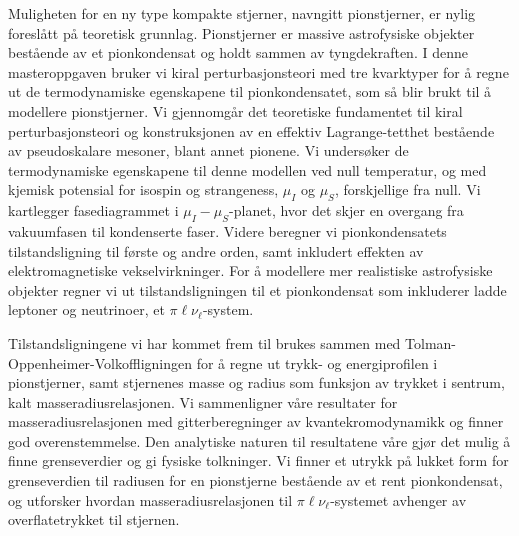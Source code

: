 \vspace*{1.5cm}
Muligheten for en ny type kompakte stjerner, navngitt pionstjerner, er nylig foreslått på teoretisk grunnlag.
Pionstjerner er massive astrofysiske objekter bestående av et pionkondensat og holdt sammen av tyngdekraften.
I denne masteroppgaven bruker vi kiral perturbasjonsteori med tre kvarktyper for å regne ut de termodynamiske egenskapene til pionkondensatet, som så blir brukt til å modellere pionstjerner.
Vi gjennomgår det teoretiske fundamentet til kiral perturbasjonsteori og konstruksjonen av en effektiv Lagrange-tetthet bestående av pseudoskalare mesoner, blant annet pionene.
Vi undersøker de termodynamiske egenskapene til denne modellen ved null temperatur, og med kjemisk potensial for isospin og strangeness, $\mu_I$ og $\mu_S$, forskjellige fra null.
Vi kartlegger fasediagrammet i $\mu_I-\mu_S$-planet, hvor det skjer en overgang fra vakuumfasen til kondenserte faser.
Videre beregner vi pionkondensatets tilstandsligning til første og andre orden, samt inkludert effekten av elektromagnetiske vekselvirkninger.
For å modellere mer realistiske astrofysiske objekter regner vi ut tilstandsligningen til et pionkondensat som inkluderer ladde leptoner og neutrinoer, et $\pi\ell\nu_\ell$-system.

Tilstandsligningene vi har kommet frem til brukes sammen med Tolman-Oppenheimer-Volkoffligningen for å regne ut trykk- og energiprofilen i pionstjerner, samt stjernenes masse og radius som funksjon av trykket i sentrum, kalt masseradiusrelasjonen.
Vi sammenligner våre resultater for masseradiusrelasjonen med gitterberegninger av kvantekromodynamikk og finner god overenstemmelse.
Den analytiske naturen til resultatene våre gjør det mulig å finne grenseverdier og gi fysiske tolkninger.
Vi finner et utrykk på lukket form for grenseverdien til radiusen for en pionstjerne bestående av et rent pionkondensat, og utforsker hvordan masseradiusrelasjonen til $\pi\ell\nu_\ell$-systemet avhenger av overflatetrykket til stjernen.
